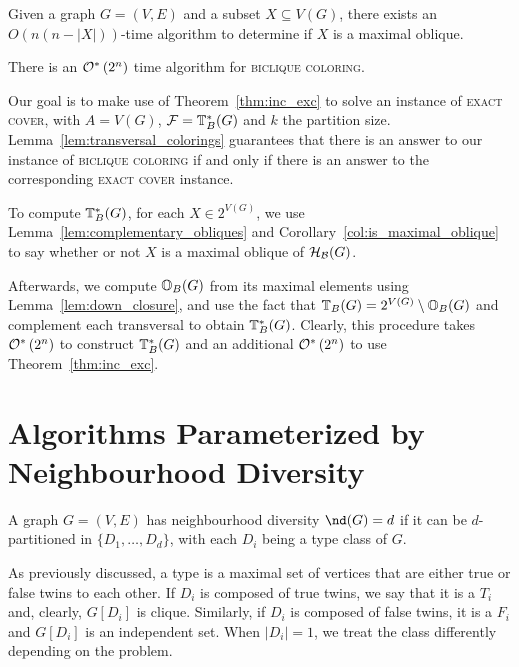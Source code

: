 \begin{corollary}
    \label{col:is_maximal_oblique}
    Given a graph $G = (V, E)$ and a subset $X \subseteq V(G)$, there exists an $O(n(n - |X|))$-time algorithm to determine if $X$ is a maximal oblique.
\end{corollary}

\begin{theorem}
    There is an $\mathcal{O}^*\left(2^n\right)$ time algorithm for \textsc{biclique coloring}.
\end{theorem}

\begin{tproof}
    Our goal is to make use of Theorem~\ref{thm:inc_exc} to solve an instance of \textsc{exact cover}, with $A = V(G)$, $\mathcal{F} = \mathbb{T}^*_{B}(G)$ and $k$ the partition size.
    Lemma~\ref{lem:transversal_colorings} guarantees that there is an answer to our instance of \textsc{biclique coloring} if and only if there is an answer to the corresponding \textsc{exact cover} instance.
    
    To compute $\mathbb{T}^*_{B}(G)$, for each $X \in 2^{V(G)}$, we use Lemma~\ref{lem:complementary_obliques} and Corollary~\ref{col:is_maximal_oblique} to say whether or not $X$ is a maximal oblique of $\mathcal{H}_{\mathcal{B}}(G)$.
    
    Afterwards, we compute $\mathbb{O}_{B}(G)$ from its maximal elements using Lemma~\ref{lem:down_closure}, and use the fact that $\mathbb{T}_{B}(G) = 2^{V(G)} \setminus \mathbb{O}_{B}(G)$ and complement each transversal to obtain $\mathbb{T}^*_{B}(G)$.
    Clearly, this procedure takes $\mathcal{O}^*\left(2^n\right)$ to construct $\mathbb{T}^*_{B}(G)$ and an additional $\mathcal{O}^*\left(2^n\right)$ to use Theorem~\ref{thm:inc_exc}.
\end{tproof}

\section{Algorithms Parameterized by Neighbourhood Diversity}

\begin{definition}
    A graph $G = (V,E)$ has neighbourhood diversity $\nd(G) = d$ if it can be $d$-partitioned in $\{D_1, \dots, D_d\}$, with each $D_i$ being a type class of $G$.
\end{definition}

As previously discussed, a type is a maximal set of vertices that are either true or false twins to each other.
If $D_i$ is composed of true twins, we say that it is a  $T_i$ and, clearly, $G[D_i]$ is clique.
Similarly, if $D_i$ is composed of false twins, it is a  $F_i$ and $G[D_i]$ is an independent set.
When $|D_i| = 1$, we treat the class differently depending on the problem.

